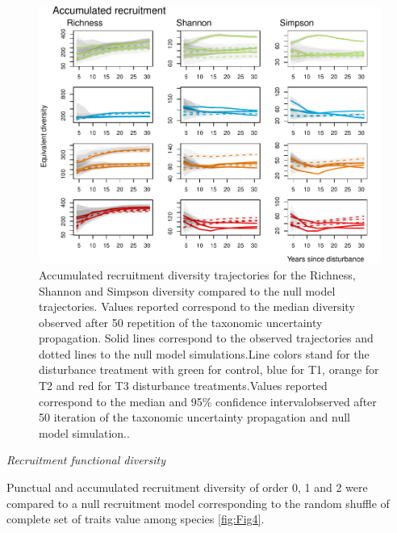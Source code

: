 \documentclass[fleqn,10pt]{ArtEcoFoG} %
\begin{document}
\begin{figure}

{\centering \includegraphics[width=0.8\linewidth]{RecruitmentTrajectories_files/figure-latex/Fig3-1} 

}

\caption{Accumulated recruitment diversity trajectories for the Richness, Shannon and Simpson diversity compared to the null model trajectories. Values reported correspond to the median diversity observed after 50 repetition of the taxonomic uncertainty propagation. Solid lines correspond to the observed trajectories and dotted lines to the null model simulations.Line colors stand for the disturbance treatment with green for control, blue for T1, orange for T2 and red for T3 disturbance treatments.Values reported correspond to the median and 95\% confidence intervalobserved after 50 iteration of the taxonomic uncertainty propagation and null model simulation..}\label{fig:Fig3}
\end{figure}

\emph{Recruitment functional diversity }

Punctual and accumulated recruitment diversity of order 0, 1 and 2 were
compared to a null recruitment model corresponding to the random shuffle
of complete set of traits value among species \ref{fig:Fig4}.
\end{document}
